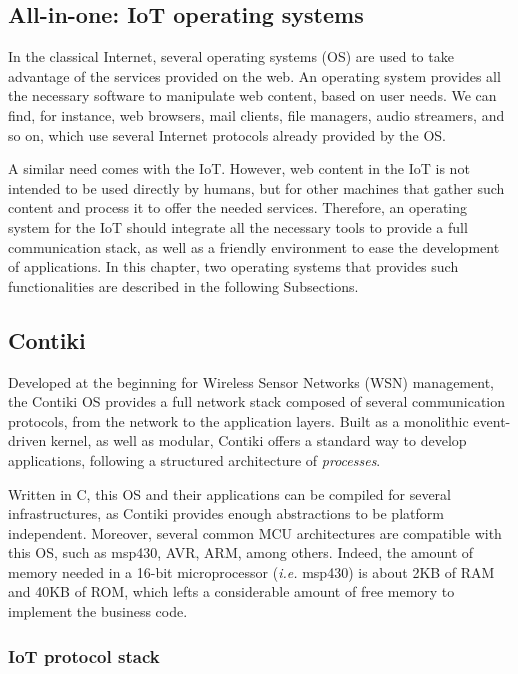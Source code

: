 \subsection{All-in-one: IoT operating systems}
\label{subsec:IoTOS}
In the classical Internet, several operating systems (OS) are used to take advantage of the services provided on the web.
An operating system provides all the necessary software to manipulate web content, based on user needs.
We can find, for instance, web browsers, mail clients, file managers, audio streamers, and so on, which use several Internet protocols already provided by the OS.

A similar need comes with the IoT.
However, web content in the IoT is not intended to be used directly by humans, but for other machines that gather such content and process it to offer the needed services.
Therefore, an operating system for the IoT should integrate all the necessary tools to provide a full communication stack, as well as a friendly environment to ease the development of applications.
In this chapter, two operating systems that provides such functionalities are described in the following Subsections.

\subsection{Contiki}
\label{subsec:contiki}
Developed at the beginning for Wireless Sensor Networks (WSN) management, the Contiki OS \cite{dunkels2004contiki} provides a full network stack composed of several communication protocols, from the network to the application layers.
Built as a monolithic event-driven kernel, as well as modular, Contiki offers a standard way to develop applications, following a structured architecture of \textit{processes}.

Written in C, this OS and their applications can be compiled for several infrastructures, as Contiki provides enough abstractions to be platform independent.
Moreover, several common MCU architectures are compatible with this OS, such as msp430, AVR, ARM, among others.
Indeed, the amount of memory needed in a 16-bit microprocessor (\textit{i.e.} msp430) is about 2KB of RAM and 40KB of ROM, which lefts a considerable amount of free memory to implement the business code.

\subsubsection{IoT protocol stack}

